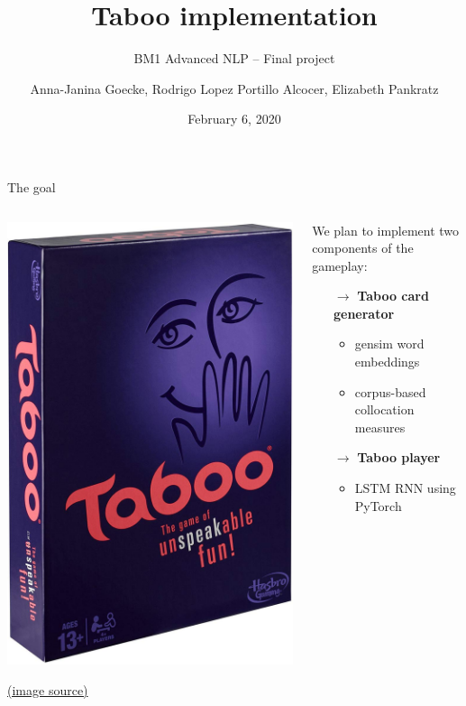\documentclass[11pt]{beamer}
\title{Taboo implementation}
\subtitle{BM1 Advanced NLP -- Final project}
\date{February 6, 2020}
\author{Anna-Janina Goecke, \newline Rodrigo Lopez Portillo Alcocer, \newline Elizabeth Pankratz \newline}
\institute{Universität Potsdam}
\begin{document}
	
\maketitle


\begin{frame}{The goal}

\begin{columns}

\begin{column}{0.5\textwidth}

	\begin{center}
		\includegraphics[width=.6\linewidth]{taboo.jpg}
	\end{center}
		
	\vfill 
	{\tiny \href{https://www.amazon.com/Hasbro-A4626-Taboo-Board-Game/dp/B00D4NJSBW}{(image source)} }

\end{column}

\begin{column}{0.5\textwidth}

	We plan to implement two components of the gameplay:
	
	\begin{itemize}
		\item[$\rightarrow$] \textbf{Taboo card generator}
		\begin{itemize}
			\item gensim word embeddings
			\item corpus-based collocation measures
		\end{itemize}
		\item[$\rightarrow$] \textbf{Taboo player}
		\begin{itemize}
			\item LSTM RNN using PyTorch
		\end{itemize}
	\end{itemize}


\end{column}
\end{columns}
\end{frame}
\end{document}
